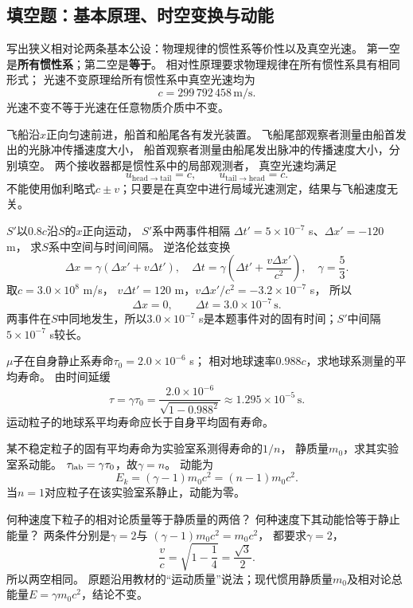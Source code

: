 \subsection{填空题：基本原理、时空变换与动能}

\problemtext 写出狭义相对论两条基本公设：物理规律的惯性系等价性以及真空光速。
\workings
第一空是\textbf{所有惯性系}；第二空是\textbf{等于}。
相对性原理要求物理规律在所有惯性系具有相同形式；
光速不变原理给所有惯性系中真空光速均为
\[
\boxed{c=299\,792\,458\,\mathrm{m/s}}.
\]
\crosscheck 光速不变不等于光速在任意物质介质中不变。

\problemtext 飞船沿$x$正向匀速前进，船首和船尾各有发光装置。
飞船尾部观察者测量由船首发出的光脉冲传播速度大小，
船首观察者测量由船尾发出脉冲的传播速度大小，分别填空。
\workings
两个接收器都是惯性系中的局部观测者，
真空光速均满足
\[
\boxed{u_{\mathrm{head\to tail}}=c},\qquad
\boxed{u_{\mathrm{tail\to head}}=c}.
\]
\crosscheck 不能使用伽利略式$c\pm v$；只要是在真空中进行局域光速测定，结果与飞船速度无关。

\problemtext $S'$以$0.8c$沿$S$的$x$正向运动，
$S'$系中两事件相隔
$\Delta t'=5\times10^{-7}$ s、$\Delta x'=-120$ m，
求$S$系中空间与时间间隔。
\workings
逆洛伦兹变换
\[
\Delta x=\gamma(\Delta x'+v\Delta t'),
\quad
\Delta t=\gamma\left(\Delta t'+\frac{v\Delta x'}{c^2}\right),
\quad\gamma=\frac53.
\]
取$c=3.0\times10^8$ m/s，
$v\Delta t'=120$ m，$v\Delta x'/c^2=-3.2\times10^{-7}$ s，
所以
\[
\boxed{\Delta x=0},\qquad
\boxed{\Delta t=3.0\times10^{-7}\,\mathrm s}.
\]
\crosscheck 两事件在$S$中同地发生，所以$3.0\times10^{-7}$ s是本题事件对的固有时间；$S'$中间隔$5\times10^{-7}$ s较长。

\problemtext $\mu$子在自身静止系寿命$\tau_0=2.0\times10^{-6}$ s；
相对地球速率$0.988c$，求地球系测量的平均寿命。
\workings
由时间延缓
\[
\boxed{\tau=\gamma\tau_0
=\frac{2.0\times10^{-6}}{\sqrt{1-0.988^2}}
\approx1.295\times10^{-5}\,\mathrm s}.
\]
\crosscheck 运动粒子的地球系平均寿命应长于自身平均固有寿命。

\problemtext 某不稳定粒子的固有平均寿命为实验室系测得寿命的$1/n$，
静质量$m_0$，求其实验室系动能。
\workings
$\tau_{\rm lab}=\gamma\tau_0$，故$\gamma=n$。
动能为
\[
\boxed{E_k=(\gamma-1)m_0c^2=(n-1)m_0c^2}.
\]
\crosscheck 当$n=1$对应粒子在该实验室系静止，动能为零。

\problemtext 何种速度下粒子的相对论质量等于静质量的两倍？
何种速度下其动能恰等于静止能量？
\workings
两条件分别是$\gamma=2$与
$(\gamma-1)m_0c^2=m_0c^2$，
都要求$\gamma=2$，
\[
\boxed{\frac vc=\sqrt{1-\frac14}=\frac{\sqrt3}{2}}.
\]
所以两空相同。
\crosscheck 原题沿用教材的“运动质量”说法；现代惯用静质量$m_0$及相对论总能量$E=\gamma m_0c^2$，结论不变。
